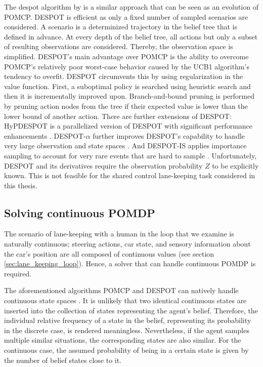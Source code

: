The \gls{despot} algorithm by \cite{despot} is a similar approach that can be seen as an evolution of POMCP. DESPOT is efficient as only a fixed number of sampled scenarios are considered. A scenario is a determinized trajectory in the belief tree that is defined in advance. At every depth of the belief tree, all actions but only a subset of resulting observations are considered. Thereby, the observation space is simplified. DESPOT's main advantage over POMCP is the ability to overcome POMCP's relatively poor worst-case behavior \parencite{pomcp-worst-case} caused by the UCB1 algorithm's tendency to overfit. DESPOT circumvents this by using regularization in the value function. First, a suboptimal policy is searched using heuristic search \parencite{solver_hsvi} and then it is incrementally improved upon. Branch-and-bound pruning is performed by pruning action nodes from the tree if their expected value is lower than the lower bound of another action. There are further extensions of DESPOT: HyPDESPOT is a parallelized version of DESPOT with significant performance enhancements \parencite{hyp-despot}. DESPOT-$\alpha$ further improves DESPOT's capability to handle very large observation and state spaces \parencite{despot-a}. And DESPOT-IS applies importance sampling to account for very rare events that are hard to sample \parencite{despot-is}. Unfortunately, DESPOT and its derivatives require the observation probability $Z$ to be explicitly known. This is not feasible for the shared control lane-keeping task considered in this thesis.

\subsection{Solving continuous POMDP}

The scenario of lane-keeping with a human in the loop that we examine is naturally continuous; steering actions, car state, and sensory information about the car's position are all composed of continuous values (see section \ref{sec:lane_keeping_loop}). Hence, a solver that can handle continuous POMDP is required.

The aforementioned algorithms POMCP and DESPOT can natively handle continuous state spaces \parencite{pomcp_continuous}. It is unlikely that two identical continuous states are inserted into the collection of states representing the agent's belief. Therefore, the individual relative frequency of a state in the belief, representing its probability in the discrete case, is rendered meaningless. Nevertheless, if the agent samples multiple similar situations, the corresponding states are also similar. For the continuous case, the assumed probability of being in a certain state is given by the number of belief states close to it.

